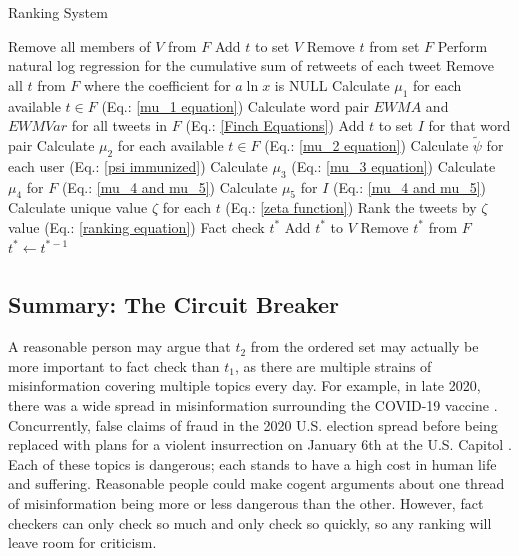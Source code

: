 \documentclass[preprint,review,12pt]{elsarticle}
\begin{document}
\begin{algorithm}
\label{Ranking System Algorithm}
	\caption{Ranking System}
	\begin{algorithmic}[1]
		\State Remove all members of $V$ from $F$
		\State Add $t$ to set $V$
		\State Remove $t$ from set $F$
		\EndIf
		\State Perform natural log regression for the cumulative sum of retweets of each tweet
		\State Remove all $t$ from $F$ where the coefficient for $a\ln x$ is NULL
		\State Calculate $\mu_1$ for each available $t \in F$
		(Eq.: \ref{mu_1 equation})
		\State Calculate word pair $EWMA$ and $EWMVar$ for all tweets in $F$ (Eq.: \ref{Finch Equations})
		\State Add $t$ to set $I$ for that word pair
		\EndIf
		\State Calculate $\mu_2$ for each available $t \in F$ (Eq.: \ref{mu_2 equation})
		\State Calculate $\tilde{\psi}$ for each user (Eq.: \ref{psi immunized})
		\State Calculate $\mu_3$ (Eq.: \ref{mu_3 equation})
		\State Calculate $\mu_4$ for $F$ (Eq.: \ref{mu_4 and mu_5})
		\State Calculate $\mu_5$ for $I$ (Eq.: \ref{mu_4 and mu_5})
		\EndIf
		\State Calculate unique value $\zeta$ for each $t$ (Eq.: \ref{zeta function})
		\State Rank the tweets by $\zeta$ value (Eq.: \ref{ranking equation})
		\State Fact check $t^*$ 
		\State Add $t^*$ to $V$
		\State Remove $t^*$ from $F$
		\State $t^* \xleftarrow[]{} t^{*-1}$
		\EndFor
		\EndWhile
		\EndFor
	\end{algorithmic} 
\end{algorithm} 
\newpage
\subsection{Summary: The Circuit Breaker}
A reasonable person may argue that $t_2$ from the ordered set may actually be more important to fact check than $t_1$, as there are multiple strains of misinformation covering multiple topics every day.  For example, in late 2020, there was a wide spread in misinformation surrounding the COVID-19 vaccine \cite{mills2020covid,bagherpour2020covid}. Concurrently, false claims of fraud in the 2020 U.S. election \cite{dean2020facebook} spread before being replaced with plans for a violent insurrection on January 6th at the U.S. Capitol \cite{fandos2021trump,Levenson2021capitol}. Each of these topics is dangerous; each stands to have a high cost in human life and suffering. Reasonable people could make cogent arguments about one thread of misinformation being more or less dangerous than the other. However, fact checkers can only check so much and only check so quickly, so any ranking will leave room for criticism.
\end{document}
